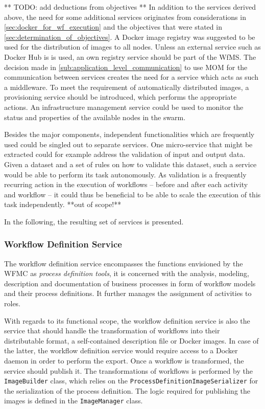   ** TODO: add deductions from objectives **
  In addition to the services derived above, the need for some additional services originates from considerations in \ref{sec:docker_for_wf_execution} and the objectives that were stated in \ref{sec:determination_of_objectives}.
  A Docker image registry was suggested to be used for the distribution of images to all nodes. Unless an external service such as Docker Hub is is used, an own registry service should be part of the \ac{WfMS}.
  The decision made in \ref{sub:application_level_communication} to use \ac{MOM} for the communication between services creates the need for a service which acts as such a middleware.
  To meet the requirement of automatically distributed images, a provisioning service should be introduced, which performs the appropriate actions. An infrastructure management service could be used to monitor the status and properties of the available nodes in the swarm.

  Besides the major components, independent functionalities which are frequently used could be singled out to separate services.
  One micro-service that might be extracted could for example address the validation of input and output data. Given a dataset and a set of rules on how to validate this dataset, such a service would be able to perform its task autonomously. As validation is a frequently recurring action in the execution of workflows -- before and after each activity and workflow -- it could thus be beneficial to be able to scale the execution of this task independently. **out of scope!**

  In the following, the resulting set of services is presented.

  \subsubsection{Workflow Definition Service} %
    \label{subs:workflow_definition_service}

    The workflow definition service encompasses the functions envisioned by the \ac{WFMC} as \emph{process definition tools}, \ie it is concerned with the analysis, modeling, description and documentation of business processes in form of workflow models and their process definitions. It further manages the assignment of activities to roles.

    With regards to its functional scope, the workflow definition service is also the service that should handle the transformation of workflows into their distributable format, \eg a self-contained description file or Docker images. In case of the latter, the workflow definition service would require access to a Docker daemon in order to perform the export. Once a workflow is transformed, the service should publish it. The transformations of workflows is performed by the \texttt{ImageBuilder} class, which relies on the \texttt{ProcessDefinitionImageSerializer} for the serialization of the process definition. The logic required for publishing the images is defined in the \texttt{ImageManager} class.


